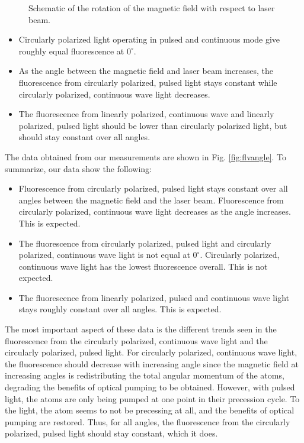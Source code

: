 \begin{figure}[htpb]
	\centering
	
	\caption{Schematic of the rotation of the magnetic field with respect to laser beam.}
	\label{fig:flvanglesch}
\end{figure}


\begin{itemize}
	\item Circularly polarized light operating in pulsed and continuous mode give roughly equal fluorescence at $0^{\circ}$.
	\item As the angle between the magnetic field and laser beam increases, the fluorescence from circularly polarized, pulsed light stays constant while circularly polarized, continuous wave light decreases.
	\item The fluorescence from linearly polarized, continuous wave and linearly polarized, pulsed light should be lower than circularly polarized light, but should stay constant over all angles.
\end{itemize}

The data obtained from our measurements are shown in Fig. \ref{fig:flvangle}. To summarize, our data show the following:
\begin{itemize}
	\item Fluorescence from circularly polarized, pulsed light stays constant over all angles between the magnetic field and the laser beam. Fluorescence from circularly polarized, continuous wave light decreases as the angle increases. This is expected.
	\item The fluorescence from circularly polarized, pulsed light and circularly polarized, continuous wave light is not equal at $0^{\circ}$. Circularly polarized, continuous wave light has the lowest fluorescence overall. This is not expected.
	\item The fluorescence from linearly polarized, pulsed and continuous wave light stays roughly constant over all angles. This is expected.
\end{itemize}

The most important aspect of these data is the different trends seen in the fluorescence from the circularly polarized, continuous wave light and the circularly polarized, pulsed light. For circularly polarized, continuous wave light, the fluorescence should decrease with increasing angle since the magnetic field at increasing angles is redistributing the total angular momentum of the atoms, degrading the benefits of optical pumping to be obtained. However, with pulsed light, the atoms are only being pumped at one point in their precession cycle. To the light, the atom seems to not be precessing at all, and the benefits of optical pumping are restored. Thus, for all angles, the fluorescence from the circularly polarized, pulsed light should stay constant, which it does.

